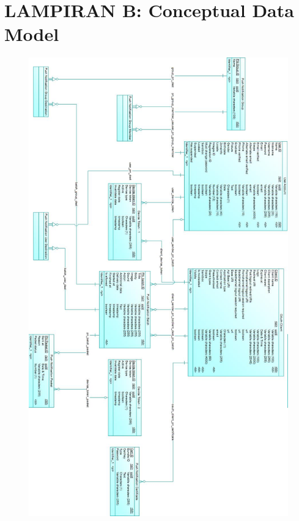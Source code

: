 \chapter{LAMPIRAN B: Conceptual Data Model} \label{lampiran:cdm}
\begin{figure}[H]
	\centering\includegraphics[height=0.87\textheight]{penutup/lampiran/b/CDM.jpg}
\end{figure}
